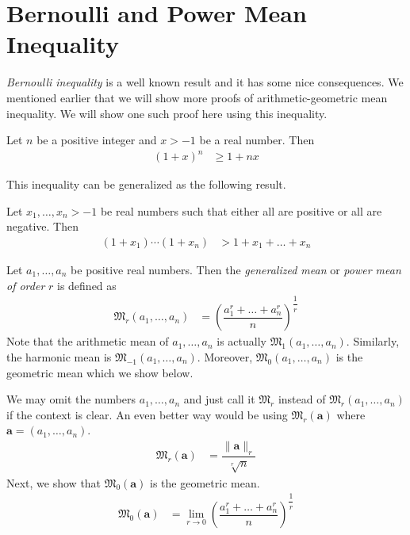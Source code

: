 \documentclass{subfile}
\begin{document}
	\section{Bernoulli and Power Mean Inequality}\label{sec:powermean}
	\emph{Bernoulli inequality} is a well known result and it has some nice consequences. We mentioned earlier that we will show more proofs of arithmetic-geometric mean inequality. We will show one such proof here using this inequality.
		\begin{theorem}
			Let $n$ be a positive integer and $x>-1$ be a real number. Then
				\begin{align*}
					(1+x)^n
						& \geq1+nx
				\end{align*}
		\end{theorem}
	This inequality can be generalized as the following result.
		\begin{theorem}
			Let $x_1,\ldots,x_n>-1$ be real numbers such that either all are positive or all are negative. Then
				\begin{align*}
					(1+x_1)\cdots(1+x_n)
						& > 1+x_1+\ldots+x_n
				\end{align*}
		\end{theorem}%
	
		\begin{definition}
			Let $a_1,\ldots,a_n$ be positive real numbers. Then the \emph{generalized mean} or \emph{power mean of order} $r$ is defined as
				\begin{align*}
					\mathfrak{M}_r(a_1,\ldots,a_n)
						& = \left(\dfrac{a_1^r+\ldots+a_n^r}{n}\right)^{\dfrac{1}{r}}
				\end{align*}
			Note that the arithmetic mean of $a_1,\ldots,a_n$ is actually $\mathfrak{M}_1(a_1,\ldots,a_n)$. Similarly, the harmonic mean is $\mathfrak{M}_{-1}(a_1,\ldots,a_n)$. Moreover, $\mathfrak{M}_0(a_1,\ldots,a_n)$ is the geometric mean which we show below.
		\end{definition}
	We may omit the numbers $a_{1},\ldots,a_{n}$ and just call it $\mathfrak{M}_r$ instead of $\mathfrak{M}_r(a_1,\ldots,a_n)$ if the context is clear. An even better way would be using $\mathfrak{M}_{r}(\mathbf{a})$ where $\mathbf{a}=(a_{1},\ldots,a_{n})$.
		\begin{align*}
			\mathfrak{M}_{r}(\mathbf{a})
				& = \dfrac{\|\mathbf{a}\|_{r}}{\sqrt[r]{n}}
		\end{align*}
	Next, we show that $\mathfrak{M}_{0}(\mathbf{a})$ is the geometric mean.
		\begin{align*}
			\mathfrak{M}_{0}(\mathbf{a})
				& = \lim\limits_{r\to0}\left(\dfrac{a_1^r+\ldots+a_n^r}{n}\right)^{\dfrac{1}{r}}
		\end{align*}
	
\end{document}
